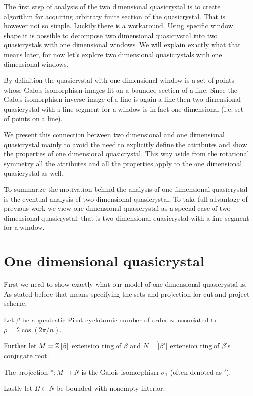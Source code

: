 \documentclass[text.tex]{subfiles}
\begin{document}
The first step of analysis of the two dimensional quasicrystal is to create algorithm for acquiring arbitrary finite section of the quasicrystal. That is however not so simple. Luckily there is a workaround. Using specific window shape it is possible to decompose two dimensional quasicrystal into two quasicrystals with one dimensional windows. We will explain exactly what that means later, for now let's explore two dimensional quasicrystals with one dimensional windows. 

By definition the quasicrystal with one dimensional window is a set of points whose Galois isomorphism images fit on a bounded section of a line. Since the Galois isomorphism inverse image of a line is again a line then two dimensional quasicrystal with a line segment for a window is in fact one dimensional (i.e. set of points on a line). 

We present this connection between two dimensional and one dimensional quasicrystal mainly to avoid the need to explicitly define the attributes and show the properties of one dimensional quasicrystal. This way aside from the rotational symmetry all the attributes and all the properties apply to the one dimensional quasicrystal as well. 

To summarize the motivation behind the analysis of one dimensional quasicrystal is the eventual analysis of two dimensional quasicrystal. To take full advantage of previous work we view one dimensional quasicrystal as a special case of two dimensional quasicrystal, that is two dimensional quasicrystal with a line segment for a window. 

\section{One dimensional quasicrystal}
First we need to show exactly what our model of one dimensional quasicrystal is. As stated before that means specifying the sets and projection for cut-and-project scheme. 

Let $\beta$ be a quadratic Pisot-cyclotomic number of order $n$, associated to $\rho = 2\cos\left(2\pi/n\right)$. 

Further let $M = \mathbb{Z}\left[\beta\right]$ extension ring of $\beta$ and $N = \ring[\beta']$ extension ring of $\beta$'s conjugate root.

The projection $\ast:M\rightarrow N$ is the Galois isomorphism $\sigma_1$ (often denoted as $'$). 

Lastly let $\Omega\subset N$ be bounded with nonempty interior. 
\end{document}
